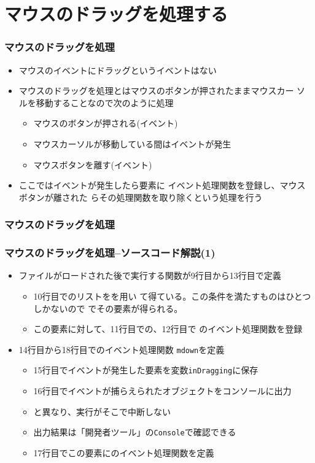 \section{マウスのドラッグを処理する}
\begin{frame}[containsverbatim]
 \frametitle{マウスのドラッグを処理}
\begin{itemize}
 \item マウスのイベントにドラッグというイベントはない
 \item マウスのドラッグを処理とはマウスのボタンが押されたままマウスカー
       ソルを移動することなので次のように処理
\begin{itemize}
 \item マウスのボタンが押される(イベント)
 \item マウスカーソルが移動している間はイベントが発生
 \item マウスボタンを離す(イベント)
\end{itemize}
 \item ここではイベントが発生したら要素に
       イベント処理関数を登録し、マウスボタンが離された
       らその処理関数を取り除くという処理を行う
\end{itemize}
\end{frame}
\begin{frame}[containsverbatim]
 \frametitle{マウスのドラッグを処理}
\end{frame}
\begin{frame}[containsverbatim]
 \frametitle{マウスのドラッグを処理--ソースコード解説(1)}
\begin{itemize}
 \item ファイルがロードされた後で実行する関数が9行目から13行目で定義
   \begin{itemize}
    \item 10行目でのリストをを用い
          て得ている。この条件を満たすものはひとつしかないので
          \JSKey{[0]}でその要素が得られる。
    \item この要素に対して、11行目での、12行目で
          のイベント処理関数を登録
   \end{itemize}
 \item 14行目から18行目でのイベント処理関数
       \texttt{mdown}を定義
  \begin{itemize}
   \item 15行目でイベントが発生した要素を変数\texttt{inDragging}に保存
	 \item 16行目でイベントが捕らえられたオブジェクトをコンソールに出力
	 \item {}と異なり、実行がそこで中断しない
	 \item 出力結果は「開発者ツール」の\texttt{Console}で確認できる
   \item 17行目でこの要素にのイベント処理関数を定義
  \end{itemize}
\end{itemize}
\end{frame}
